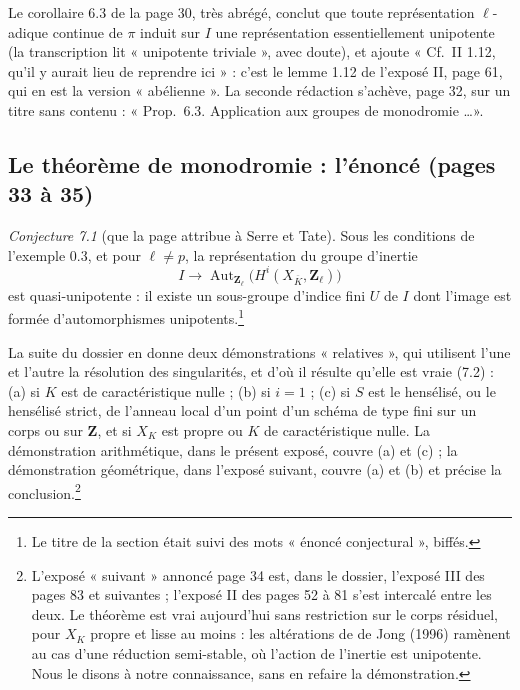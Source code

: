 \documentclass[11pt,a4paper]{article}
\begin{document}
Le corollaire 6.3 de la page 30, très abrégé, conclut que toute représentation
$\ell$-adique continue de $\pi$ induit sur $I$ une représentation
essentiellement unipotente (la transcription lit « unipotente triviale », avec
doute), et ajoute « Cf.\ II 1.12, qu'il y aurait lieu de reprendre ici » :
c'est le lemme 1.12 de l'exposé II, page 61, qui en est la version
« abélienne ». La seconde rédaction s'achève, page 32, sur un titre sans
contenu : « Prop.\ 6.3. Application aux groupes de monodromie \ldots ».

\subsection*{Le théorème de monodromie : l'énoncé (pages 33 à 35)}

\emph{Conjecture 7.1} (que la page attribue à Serre et Tate). Sous les conditions
de l'exemple 0.3, et pour $\ell \neq p$, la représentation du groupe d'inertie
\[
  I \longrightarrow \operatorname{Aut}_{\mathbf{Z}_\ell}\bigl(H^i(X_{\overline K}, \mathbf{Z}_\ell)\bigr)
\]
est quasi-unipotente : il existe un sous-groupe d'indice fini $U$ de $I$ dont
l'image est formée d'automorphismes unipotents.\footnote{Le titre de la section
était suivi des mots « énoncé conjectural », biffés.}

La suite du dossier en donne deux démonstrations « relatives », qui utilisent
l'une et l'autre la résolution des singularités, et d'où il résulte qu'elle est
vraie (7.2) : (a) si $K$ est de caractéristique nulle ; (b) si $i = 1$ ; (c) si
$S$ est le hensélisé, ou le hensélisé strict, de l'anneau local d'un point d'un
schéma de type fini sur un corps ou sur $\mathbf{Z}$, et si $X_K$ est propre ou
$K$ de caractéristique nulle. La démonstration arithmétique, dans le présent
exposé, couvre (a) et (c) ; la démonstration géométrique, dans l'exposé suivant,
couvre (a) et (b) et précise la conclusion.\footnote{L'exposé « suivant »
annoncé page 34 est, dans le dossier, l'exposé III des pages 83 et suivantes ;
l'exposé II des pages 52 à 81 s'est intercalé entre les deux. Le
théorème est vrai aujourd'hui sans restriction sur le corps résiduel, pour
$X_K$ propre et lisse au moins : les altérations de de Jong (1996) ramènent au
cas d'une réduction semi-stable, où l'action de l'inertie est unipotente. Nous
le disons à notre connaissance, sans en refaire la démonstration.}
\end{document}
